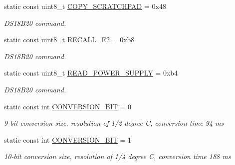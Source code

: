 \begin{DoxyCompactItemize}
\mbox{\label{class_d_s2482_command_a7f07252843b8d21db0977f4b6bfd487d}} 
static const uint8\+\_\+t \mbox{\hyperlink{class_d_s2482_command_a7f07252843b8d21db0977f4b6bfd487d}{C\+O\+P\+Y\+\_\+\+S\+C\+R\+A\+T\+C\+H\+P\+AD}} = 0x48
\begin{DoxyCompactList}\small\item\em D\+S18\+B20 command. \end{DoxyCompactList}\item 
\mbox{\label{class_d_s2482_command_a3ac026bc1c7c941e9246e11e4ff19de4}} 
static const uint8\+\_\+t \mbox{\hyperlink{class_d_s2482_command_a3ac026bc1c7c941e9246e11e4ff19de4}{R\+E\+C\+A\+L\+L\+\_\+\+E2}} = 0xb8
\begin{DoxyCompactList}\small\item\em D\+S18\+B20 command. \end{DoxyCompactList}\item 
\mbox{\label{class_d_s2482_command_a6785f84f3853dcc3422e13152457b712}} 
static const uint8\+\_\+t \mbox{\hyperlink{class_d_s2482_command_a6785f84f3853dcc3422e13152457b712}{R\+E\+A\+D\+\_\+\+P\+O\+W\+E\+R\+\_\+\+S\+U\+P\+P\+LY}} = 0xb4
\begin{DoxyCompactList}\small\item\em D\+S18\+B20 command. \end{DoxyCompactList}\item 
\mbox{\label{class_d_s2482_command_a2c2e20453b18655ab5b9b6935462d2e5}} 
static const int \mbox{\hyperlink{class_d_s2482_command_a2c2e20453b18655ab5b9b6935462d2e5}{C\+O\+N\+V\+E\+R\+S\+I\+O\+N\+\_\+B\+IT}} = 0
\begin{DoxyCompactList}\small\item\em 9-\/bit conversion size, resolution of 1/2 degree C, conversion time 94 ms \end{DoxyCompactList}\item 
\mbox{\label{class_d_s2482_command_ad8ac2b0d8638999ee7832c0d63a0af79}} 
static const int \mbox{\hyperlink{class_d_s2482_command_ad8ac2b0d8638999ee7832c0d63a0af79}{C\+O\+N\+V\+E\+R\+S\+I\+O\+N\+\_\+B\+IT}} = 1
\begin{DoxyCompactList}\small\item\em 10-\/bit conversion size, resolution of 1/4 degree C, conversion time 188 ms \end{DoxyCompactList}\item 

\end{DoxyCompactItemize}

